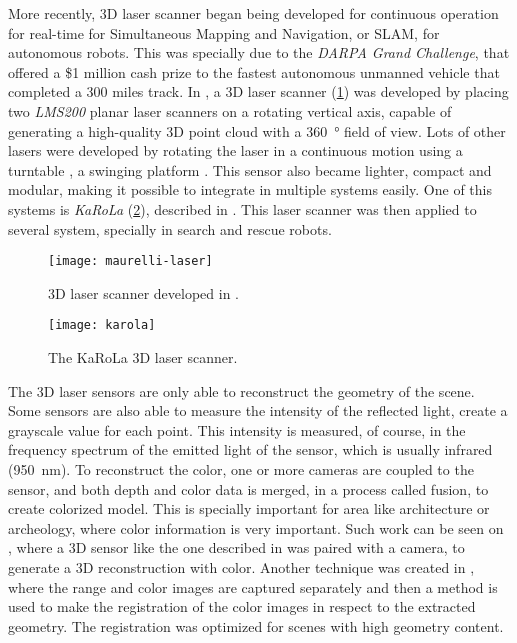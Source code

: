 More recently, 3D laser scanner began being developed for continuous operation for real-time for Simultaneous Mapping and Navigation, or SLAM, for autonomous robots. This was specially due to the \textit{DARPA Grand Challenge}, that offered a \$1 million cash prize to the fastest autonomous unmanned vehicle that completed a 300 miles track. In \cite{maurelli2009}, a 3D laser scanner (\cref{fig:maurelli-laser-scanner}) was developed by placing two \textit{LMS200} planar laser scanners on a rotating vertical axis, capable of generating a high-quality 3D point cloud with a \SI{360}{\degree} field of view. Lots of other lasers were developed by rotating the laser in a continuous motion using a turntable \cite{nemoto2007}, a swinging platform \cite{yoshida11}. This sensor also became lighter, compact and modular, making it possible to integrate in multiple systems easily. One of this systems is \textit{KaRoLa} (\cref{fig:karola}), described in \cite{karola14}. This laser scanner was then applied to several system, specially in search and rescue robots.

\begin{figure}[h]
    \centering
    \texttt{[image: maurelli-laser]}
    \caption{3D laser scanner developed in \cite{maurelli2009}.}
    \label{fig:maurelli-laser-scanner}
\end{figure}

\begin{figure}[h]
    \centering
    \texttt{[image: karola]}
    \caption{The KaRoLa 3D laser scanner.}
    \label{fig:karola}
\end{figure}

The 3D laser sensors are only able to reconstruct the geometry of the scene. Some sensors are also able to measure the intensity of the reflected light, create a grayscale value for each point. This intensity is measured, of course, in the frequency spectrum of the emitted light of the sensor, which is usually infrared (\SI{950}{\nano\meter}). To reconstruct the color, one or more cameras are coupled to the sensor, and both depth and color data is merged, in a process called fusion, to create colorized model. This is specially important for area like architecture or archeology, where color information is very important. Such work can be seen on \cite{pdias2006}, where a 3D sensor like the one described in \cite{surmann2003} was paired with a camera, to generate a 3D reconstruction with color. Another technique was created in \cite{stamus2000}, where the range and color images are captured separately and then a method is used to make the registration of the color images in respect to the extracted geometry. The registration was optimized for scenes with high geometry content.

